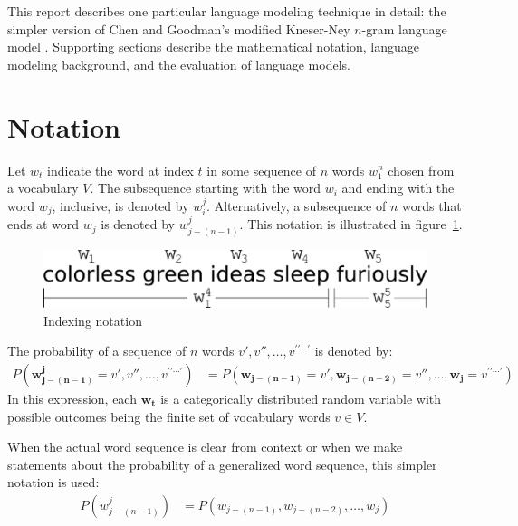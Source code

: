 \documentclass[10pt]{article}
\newcommand{\bs}[1]{\boldsymbol{#1}}
\newcommand{\ngram}{$n$-gram\xspace}
\newcommand{\prb}[1]{P\left(#1\right)}
\begin{document}
This report describes one particular language modeling technique in detail: the simpler version of Chen and Goodman's modified Kneser-Ney \ngram language model \cite{chen1998empirical}.
Supporting sections describe the mathematical notation, language modeling background, and the evaluation of language models.


\section{Notation} 

Let $w_t$ indicate the word at index $t$ in some sequence of $n$ words $w_1^n$ chosen from a vocabulary $V$.
The subsequence starting with the word $w_i$ and ending with the word $w_j$, inclusive, is denoted by $w_i^j$.
Alternatively, a subsequence of $n$ words that ends at word $w_j$ is denoted by $w^j_{j-(n-1)}$.
This notation is illustrated in figure~\ref{figNotation}.
\begin{figure}[h!]
\centering
\includegraphics[scale=0.40]{notation.eps}
\caption{Indexing notation}
\label{figNotation}
\end{figure}

The probability of a sequence of $n$ words $v',v'',\ldots,v^{\prime\prime\cdots\prime}$ is denoted by:
\begin{align}
\prb{\bs{w^j_{j-(n-1)}} {=} v',v'',\ldots,v^{\prime\prime\cdots\prime}} &= \prb{\bs{w_{j-(n-1)}}{=}v',\bs{w_{j-(n-2)}}{=}v'',\ldots,\bs{w_j}{=}v^{\prime\prime\cdots\prime}} \label{equProbWordsStrict}
\end{align}
In this expression, each $\bs{w_t}$ is a categorically distributed random variable with possible outcomes being the finite set of vocabulary words $v \in V$.

When the actual word sequence is clear from context or when we make statements about the probability of a generalized word sequence, this simpler notation is used:
\begin{align}
\prb{w^j_{j-(n-1)}} &= \prb{w_{j-(n-1)},w_{j-(n-2)},\ldots,w_j} \label{equProbWords}
\end{align}
\end{document}
